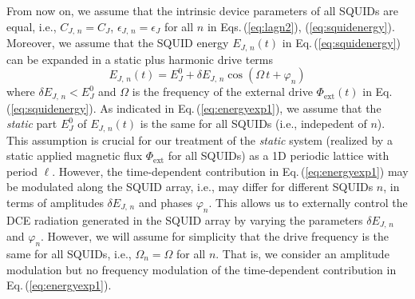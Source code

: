 From now on, we assume that the intrinsic device parameters of all SQUIDs are equal, i.e., 
$C_{J,\,n} = C_J$, $\epsilon_{J,\,n} = \epsilon_J$ for all $n$ in Eqs.\,(\ref{eq:lagn2}), (\ref{eq:squidenergy}).  
Moreover, we assume that the SQUID energy $E_{J,\,n}(t)$ in Eq.\,(\ref{eq:squidenergy}) 
can be expanded in a static plus harmonic drive terms
%
\begin{equation} \label{eq:energyexp1}
E_{J,\,n}(t) = E_J^0 + \delta E_{J,\,n} \cos(\Omega \, t + \varphi_n) 
\end{equation}
%
where $\delta E_{J,\,n} < E_J^0$ and $\Omega$ is the frequency of the external drive 
$\Phi_{\text{ext}}(t)$ in Eq.\,(\ref{eq:squidenergy}).
%
As indicated in Eq.\,(\ref{eq:energyexp1}), we assume that the {\em static} part 
$E_J^0$ of $E_{J,\,n}(t)$ is the same for all SQUIDs (i.e., indepedent of $n$). 
This assumption is crucial for our 
treatment of the {\em static} system (realized by a static applied magnetic flux $\Phi_{\text{ext}}$
for all SQUIDs) as a 1D periodic lattice with period $\ell$. However, the 
time-dependent contribution in Eq.\,(\ref{eq:energyexp1})
may be modulated along the SQUID array, i.e., may differ for different SQUIDs $n$,
in terms of amplitudes $\delta E_{J,\,n}$ and phases $\varphi_n$.
This allows us to externally control the DCE radiation generated in the SQUID array
by varying the parameters $\delta E_{J,\,n}$ and $\varphi_n$.
However, we will assume for simplicity that the drive frequency 
is the same for all SQUIDs, i.e., $\Omega_n = \Omega$ for all $n$.
That is, we consider an amplitude modulation but no frequency modulation of the 
time-dependent contribution in Eq.\,(\ref{eq:energyexp1}). 




